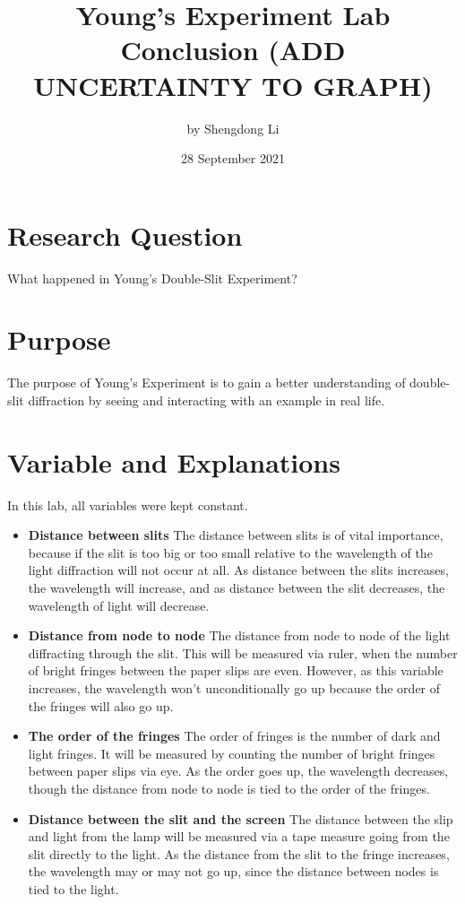 \documentclass[12pt]{article}
\begin{document}
\title{Young's Experiment Lab Conclusion (ADD UNCERTAINTY TO GRAPH)}
\author{by Shengdong Li}
\date{28 September 2021}
\maketitle

\section{Research Question}

What happened in Young's Double-Slit Experiment?

\section{Purpose}

The purpose of Young's Experiment is to gain a better understanding of double-slit diffraction by seeing and interacting with an example in real life.

\section{Variable and Explanations}

In this lab, all variables were kept constant.

\begin{itemize}
	\item \textbf{Distance between slits} The distance between slits is of vital importance, because if the slit is too big or too small relative to the wavelength of the light diffraction will not occur at all. As distance between the slits increases, the wavelength will increase, and as distance between the slit decreases, the wavelength of light will decrease.
	\item \textbf{Distance from node to node} The distance from node to node of the light diffracting through the slit. This will be measured via ruler, when the number of bright fringes between the paper slips are even. However, as this variable increases, the wavelength won't unconditionally go up because the order of the fringes will also go up.
	\item \textbf{The order of the fringes} The order of fringes is the number of dark and light fringes. It will be measured by counting the number of bright fringes between paper slips via eye. As the order goes up, the wavelength decreases, though the distance from node to node is tied to the order of the fringes.
	\item \textbf{Distance between the slit and the screen} The distance between the slip and light from the lamp will be measured via a tape measure going from the slit directly to the light. As the distance from the slit to the fringe increases, the wavelength may or may not go up, since the distance between nodes is tied to the light.
\end{itemize}
\end{document}
